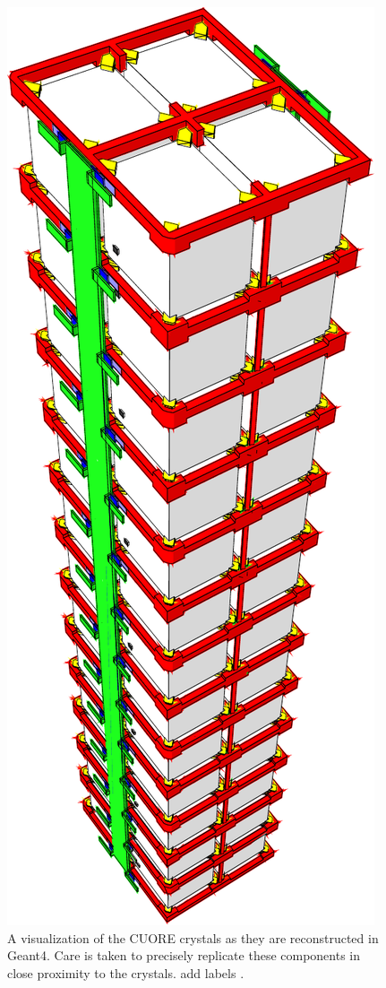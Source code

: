 \begin{figure}[htbp]
    \centering
    \includegraphics[height=0.4\paperheight]{Figures/Crystals_rotated.pdf}
    \caption[A visualization of the CUORE crystals as they are reconstructed in Geant4.]
    {A visualization of the CUORE crystals as they are reconstructed in Geant4.
    Care is taken to precisely replicate these components in close proximity to the crystals.
    \color{red} add labels \color{black}.}
    \label{fig:CUORE_crystals_MC}
\end{figure}


